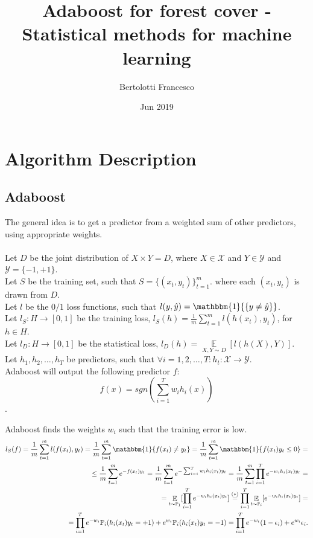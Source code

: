 \documentclass{article}
\title{Adaboost for forest cover - Statistical methods for machine learning}
\author{Bertolotti Francesco}
\date{Jun 2019} %
\DeclareMathOperator{\E}{\mathbb{E}}
\begin{document}
\maketitle

\section{Algorithm Description}
\subsection{Adaboost}

The general idea is to get a predictor from a weighted sum of other predictors, using appropriate weights.\\\\
Let $D$ be the joint distribution of $X\times Y = D$, where $X \in \mathcal{X}$ and $Y \in \mathcal{Y}$ and 
$\mathcal{Y} =\{-1,+1\}$.\\
Let $S$ be the training set, such that $S=\{(x_t,y_t)\}_{t=1}^{m}$.
where each $(x_t, y_t)$ is drawn from $D$.\\
Let $l$ be the $0/1$ loss functions, such that $l(y,\hat{y}) = \mathbbm{1}{\{y \neq \hat{y}\}}$. \\
Let $l_S:H\rightarrow[0,1]$ be the training loss, $l_S(h) = \frac{1}{m}\sum_{t=1}^{m} l(h(x_t),y_t)$,
for $h\in H$.\\
Let $l_D:H\rightarrow[0,1]$ be the statistical loss, $l_D(h) = \underset{X,Y \sim D}{\E} [l(h(X),Y)]$.\\
Let $h_1, h_2, \dots, h_T$ be predictors, such that $\forall i=1,2,\dots,T : h_t:\mathcal{X}\rightarrow\mathcal{Y}$.\\

Adaboost will output the following predictor $f$:
$$f(x) = sgn(\sum_{i=1}^{T}w_i h_i(x))$$.

Adaboost finds the weights $w_i$ such that the training error is low.\\

\begin{align*}
l_S(f) = \frac{1}{m}\sum_{t=1}^{m}l(f(x_t),y_t) 
       = \frac{1}{m}\sum_{t=1}^{m}\mathbbm{1}\{f(x_t) \neq y_t \}
       = \frac{1}{m}\sum_{t=1}^{m}\mathbbm{1}\{f(x_t) y_t \leq 0 \} =\\
       \leq \frac{1}{m}\sum_{t=1}^{m}e^{-f(x_t)y_t}
       = \frac{1}{m}\sum_{t=1}^{m}e^{-\sum_{i=1}^{T}w_i h_i(x_t) y_t}
       = \frac{1}{m} \sum_{t=1}^{m} \prod_{i=1}^{T} e^{-w_i h_i(x_t) y_t} =\\
       = \E_{t\sim \mathbb{P}_1} [\prod_{i=1}^{T} e^{-w_i h_i(x_t) y_t}] 
       \stackrel{(*)}{=} \prod_{i=1}^{T} \E_{t\sim \mathbb{P}_i} [ e^{-w_i h_i(x_t) y_t} ] =\\
       = \prod_{i=1}^{T} e^{-w_i} \mathbb{P}_i(h_i(x_t) y_t = +1) + e^{w_i} \mathbb{P}_{i}(h_i(x_t) y_t = -1) 
       = \prod_{i=1}^{T} e^{-w_i} (1-\epsilon_i) + e^{w_i} \epsilon_i.\\
\end{align*}
\end{document}
